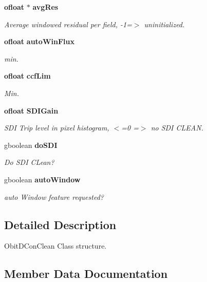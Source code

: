 \begin{CompactItemize}
{\bf ofloat} $\ast$ {\bf avg\-Res}
\begin{CompactList}\small\item\em Average windowed residual per field, -1=$>$ uninitialized. \item\end{CompactList}\item 
{\bf ofloat} {\bf auto\-Win\-Flux}
\begin{CompactList}\small\item\em min. \item\end{CompactList}\item 
{\bf ofloat} {\bf ccf\-Lim}
\begin{CompactList}\small\item\em Min. \item\end{CompactList}\item 
{\bf ofloat} {\bf SDIGain}
\begin{CompactList}\small\item\em SDI Trip level in pixel histogram, $<$=0 =$>$ no SDI CLEAN. \item\end{CompactList}\item 
gboolean {\bf do\-SDI}
\begin{CompactList}\small\item\em Do SDI CLean? \item\end{CompactList}\item 
gboolean {\bf auto\-Window}
\begin{CompactList}\small\item\em auto Window feature requested? \item\end{CompactList}\end{CompactItemize}


\subsection{Detailed Description}
Obit\-DCon\-Clean Class structure. 



\subsection{Member Data Documentation}
